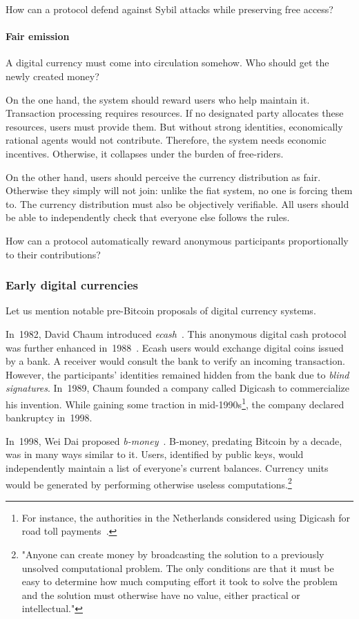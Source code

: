 How can a protocol defend against Sybil attacks while preserving free access?


\paragraph{Fair emission}

A digital currency must come into circulation somehow.
Who should get the newly created money?

On the one hand, the system should reward users who help maintain it.
Transaction processing requires resources.
If no designated party allocates these resources, users must provide them.
But without strong identities, economically rational agents would not contribute.
Therefore, the system needs economic incentives.
Otherwise, it collapses under the burden of free-riders.

On the other hand, users should perceive the currency distribution as fair.
Otherwise they simply will not join: unlike the fiat system, no one is forcing them to.
The currency distribution must also be objectively verifiable.
All users should be able to independently check that everyone else follows the rules.

How can a protocol automatically reward anonymous participants proportionally to their contributions?


\subsubsection*{Early digital currencies}

Let us mention notable pre-Bitcoin proposals of digital currency systems.

In~1982, David Chaum introduced \textit{ecash}~\cite{Chaum1982}.
This anonymous digital cash protocol was further enhanced in~1988~\cite{Chaum1988}.
Ecash users would exchange digital coins issued by a bank.
A receiver would consult the bank to verify an incoming transaction.
However, the participants' identities remained hidden from the bank due to \textit{blind signatures}.
In~1989, Chaum founded a company called Digicash to commercialize his invention.
While gaining some traction in mid-1990s\footnote{For instance, the authorities in the Netherlands considered using Digicash for road toll payments~\cite{Chaum2019}.}, the company declared bankruptcy in~1998.

In~1998, Wei Dai proposed \textit{b-money}~\cite{Dai1998}.
B-money, predating Bitcoin by a decade, was in many ways similar to it.
Users, identified by public keys, would independently maintain a list of everyone's current balances.
Currency units would be generated by performing otherwise useless computations.\footnote{"Anyone can create money by broadcasting the solution to a previously unsolved computational problem. The only conditions are that it must be easy to determine how much computing effort it took to solve the problem and the solution must otherwise have no value, either practical or intellectual."}

